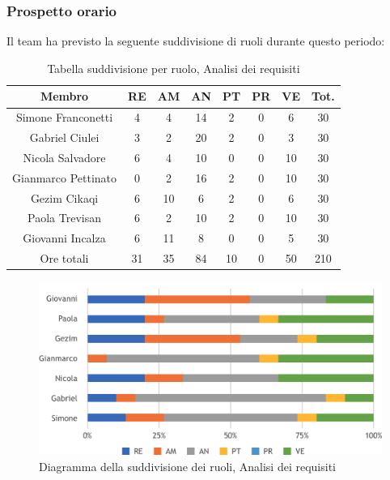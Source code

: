 \subsubsection{Prospetto orario}
Il team ha previsto la seguente suddivisione di ruoli durante questo periodo:\\
\begin{table}[h]
\caption{Tabella suddivisione per ruolo, Analisi dei requisiti}
\begin{center}
\begin{tabular}{ |c|c|c|c|c|c|c|c|  }
 \hline
 Membro 		& RE 	& AM 	& AN 	& PT 	& PR 	& VE 	& Tot.\\
 \hline\hline
 Simone	Franconetti		& 4 		& 4 		& 14 	& 2 		& 0 		& 6 		& 30\\
 Gabriel Ciulei			& 3 		& 2 		& 20 	& 2 		& 0 		& 3 		& 30\\
 Nicola	Salvadore		& 6 		& 4 		& 10 	& 0 		& 0 		& 10 	& 30\\
 Gianmarco	Pettinato	& 0 		& 2 		& 16 	& 2 		& 0 		& 10 	& 30\\
 Gezim	Cikaqi			& 6 		& 10 	 	& 6 		& 2 		& 0 		& 6	 	& 30\\
 Paola	Trevisan		& 6 		& 2 		& 10 	& 2 		& 0 		& 10 	& 30\\
 Giovanni	Incalza		& 6 		& 11 		& 8 		& 0 		& 0 		& 5  	& 30\\
 \hline\hline
 Ore totali		& 31		& 35		& 84 	& 10 	& 0 		& 50 	& 210\\
  \hline
\end{tabular}
\end{center}
\end{table}
\begin{figure}[h!]
	\includegraphics[width=\textwidth]{res/img/hi17}
	\caption{Diagramma della suddivisione dei ruoli, Analisi dei requisiti}
\end{figure}

